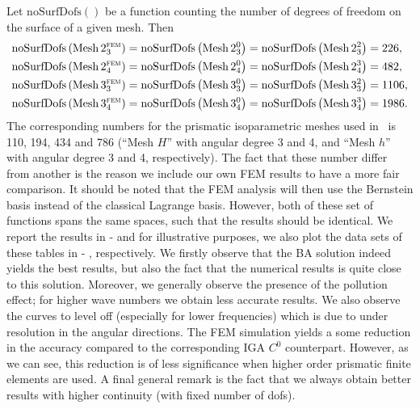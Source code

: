 Let $\mathrm{noSurfDofs}()$ be a function counting the number of degrees of freedom on the surface of a given mesh. Then
\begin{align*}
	\mathrm{noSurfDofs}\left(\mathrm{Mesh\,}2_3^{\textsc{fem}}\right) &= \mathrm{noSurfDofs}\left(\mathrm{Mesh\,}2_3^0\right) = \mathrm{noSurfDofs}\left(\mathrm{Mesh\,}2_3^2\right) = 226,\\
	\mathrm{noSurfDofs}\left(\mathrm{Mesh\,}2_4^{\textsc{fem}}\right) &= \mathrm{noSurfDofs}\left(\mathrm{Mesh\,}2_4^0\right) = \mathrm{noSurfDofs}\left(\mathrm{Mesh\,}2_4^3\right) = 482,\\
	\mathrm{noSurfDofs}\left(\mathrm{Mesh\,}3_3^{\textsc{fem}}\right) &= \mathrm{noSurfDofs}\left(\mathrm{Mesh\,}3_3^0\right) = \mathrm{noSurfDofs}\left(\mathrm{Mesh\,}3_3^2\right) = 1106,\\
	\mathrm{noSurfDofs}\left(\mathrm{Mesh\,}3_4^{\textsc{fem}}\right) &= \mathrm{noSurfDofs}\left(\mathrm{Mesh\,}3_4^0\right) = \mathrm{noSurfDofs}\left(\mathrm{Mesh\,}3_4^3\right) = 1986.
\end{align*}
The corresponding numbers for the prismatic isoparametric meshes used in~\cite{Gerdes1999otp} is 110, 194, 434 and 786 (``Mesh $H$'' with angular degree 3 and 4, and ``Mesh $h$'' with angular degree 3 and 4, respectively). The fact that these number differ from another is the reason we include our own FEM results to have a more fair comparison. It should be noted that the FEM analysis will then use the Bernstein basis instead of the classical Lagrange basis. However, both of these set of functions spans the same spaces, such that the results should be identical. We report the results in  -  and for illustrative purposes, we also plot the data sets of these tables in  - , respectively. We firstly observe that the BA solution indeed yields the best results, but also the fact that the numerical results is quite close to this solution. Moreover, we generally observe the presence of the pollution effect; for higher wave numbers we obtain less accurate results. We also observe the curves to level off (especially for lower frequencies) which is due to under resolution in the angular directions. The FEM simulation yields a some reduction in the accuracy compared to the corresponding IGA $C^0$ counterpart. However, as we can see, this reduction is of less significance when higher order prismatic finite elements are used. A final general remark is the fact that we always obtain better results with higher continuity (with fixed number of dofs). 

